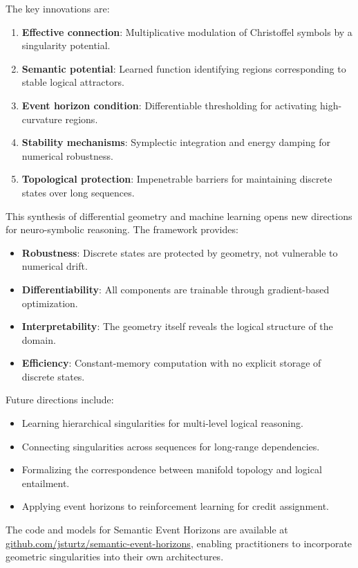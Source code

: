 \documentclass[12pt,letterpaper,twoside]{article}
\begin{document}
The key innovations are:
\begin{enumerate}
    \item \textbf{Effective connection}: Multiplicative modulation of Christoffel symbols by a singularity potential.
    \item \textbf{Semantic potential}: Learned function identifying regions corresponding to stable logical attractors.
    \item \textbf{Event horizon condition}: Differentiable thresholding for activating high-curvature regions.
    \item \textbf{Stability mechanisms}: Symplectic integration and energy damping for numerical robustness.
    \item \textbf{Topological protection}: Impenetrable barriers for maintaining discrete states over long sequences.
\end{enumerate}

This synthesis of differential geometry and machine learning opens new directions for neuro-symbolic reasoning. The framework provides:
\begin{itemize}
    \item \textbf{Robustness}: Discrete states are protected by geometry, not vulnerable to numerical drift.
    \item \textbf{Differentiability}: All components are trainable through gradient-based optimization.
    \item \textbf{Interpretability}: The geometry itself reveals the logical structure of the domain.
    \item \textbf{Efficiency}: Constant-memory computation with no explicit storage of discrete states.
\end{itemize}

Future directions include:
\begin{itemize}
    \item Learning hierarchical singularities for multi-level logical reasoning.
    \item Connecting singularities across sequences for long-range dependencies.
    \item Formalizing the correspondence between manifold topology and logical entailment.
    \item Applying event horizons to reinforcement learning for credit assignment.
\end{itemize}

The code and models for Semantic Event Horizons are available at \url{github.com/jsturtz/semantic-event-horizons}, enabling practitioners to incorporate geometric singularities into their own architectures.



\end{document}
